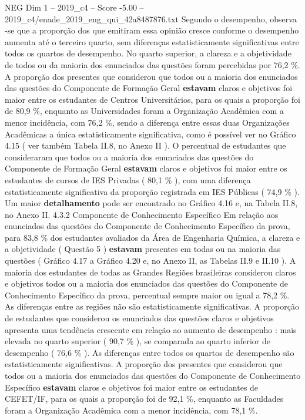 \begin{textsample}{NEG Dim 1 – 2019\_c4 – Score -5.00 – 2019\_c4/enade\_2019\_eng\_qui\_42a8487876.txt}
Segundo o desempenho, observa -se que a proporção dos que emitiram essa opinião cresce conforme o desempenho aumenta até o terceiro quarto, sem diferenças estatisticamente significativas entre todos os quartos de desempenho.
No quarto superior, a clareza e a objetividade de todos ou da maioria dos enunciados das questões foram percebidas por 76,2 \%.
A proporção dos presentes que considerou que todos ou a maioria dos enunciados das questões do Componente de Formação Geral \textbf{estavam} claros e objetivos foi maior entre os estudantes de Centros Universitários, para os quais a proporção foi de 80,9 \%, enquanto as Universidades foram a Organização Acadêmica com a menor incidência, com 76,2 \%, sendo a diferença entre essas duas Organizações Acadêmicas a única estatisticamente significativa, como é possível ver no Gráfico 4.15 ( ver também Tabela II.8, no Anexo II ).
O percentual de estudantes que consideraram que todos ou a maioria dos enunciados das questões do Componente de Formação Geral \textbf{estavam} claros e objetivos foi maior entre os estudantes de cursos de IES Privadas ( 80,1 \% ), com uma diferença estatisticamente significativa da proporção registrada em IES Públicas ( 74,9 \% ).
Um maior \textbf{detalhamento} pode ser encontrado no Gráfico 4.16 e, na Tabela II.8, no Anexo II. 4.3.2 Componente de Conhecimento Específico Em relação aos enunciados das questões do Componente de Conhecimento Específico da prova, para 83,8 \% dos estudantes avaliados da Área de Engenharia Química, a clareza e a objetividade ( Questão 5 ) \textbf{estavam} presentes em todas ou na maioria das questões ( Gráfico 4.17 a Gráfico 4.20 e, no Anexo II, as Tabelas II.9 e II.10 ).
A maioria dos estudantes de todas as Grandes Regiões brasileiras considerou claros e objetivos todos ou a maioria dos enunciados das questões do Componente de Conhecimento Específico da prova, percentual sempre maior ou igual a 78,2 \%.
As diferenças entre as regiões não são estatisticamente significativas.
A proporção de estudantes que considerou os enunciados das questões claros e objetivos apresenta uma tendência crescente em relação ao aumento de desempenho : mais elevada no quarto superior ( 90,7 \% ), se comparada ao quarto inferior de desempenho ( 76,6 \% ).
As diferenças entre todos os quartos de desempenho são estatisticamente significativas.
A proporção dos presentes que considerou que todos ou a maioria dos enunciados das questões do Componente de Conhecimento Específico \textbf{estavam} claros e objetivos foi maior entre os estudantes de CEFET/IF, para os quais a proporção foi de 92,1 \%, enquanto as Faculdades foram a Organização Acadêmica com a menor incidência, com 78,1 \%.

\end{textsample}
